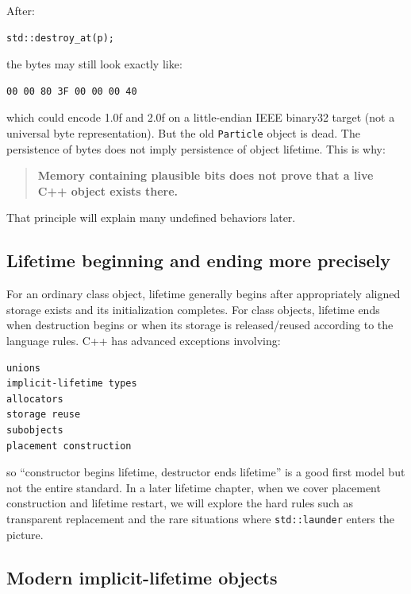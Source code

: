 After:

\begin{verbatim}
std::destroy_at(p);
\end{verbatim}

the bytes may still look exactly like:

\begin{verbatim}
00 00 80 3F 00 00 00 40
\end{verbatim}

which could encode 1.0f and 2.0f on a little-endian IEEE binary32 target (not a universal byte representation). But the old \texttt{Particle} object is dead. The persistence of bytes does not imply persistence of object lifetime. This is why:

\begin{quote}
\textbf{Memory containing plausible bits does not prove that a live C++ object exists there.}
\end{quote}

That principle will explain many undefined behaviors later.

\subsection{Lifetime beginning and ending more precisely}\label{05-engine-i-ch002-lifetime-beginning-and-ending-more-precisely}

For an ordinary class object, lifetime generally begins after appropriately aligned storage exists and its initialization completes. For class objects, lifetime ends when destruction begins or when its storage is released/reused according to the language rules. C++ has advanced exceptions involving:

\begin{verbatim}
unions
implicit-lifetime types
allocators
storage reuse
subobjects
placement construction
\end{verbatim}

so ``constructor begins lifetime, destructor ends lifetime'' is a good first model but not the entire standard. In a later lifetime chapter, when we cover placement construction and lifetime restart, we will explore the hard rules such as transparent replacement and the rare situations where \texttt{std::launder} enters the picture.

\subsection{Modern implicit-lifetime objects}\label{05-engine-i-ch002-modern-implicit-lifetime-objects}

